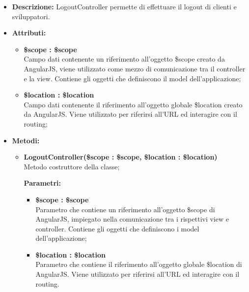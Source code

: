 \begin{itemize}
	\item \textbf{Descrizione:} LogoutController permette di effettuare il logout di clienti e sviluppatori.
	\item \textbf{Attributi:}
	\begin{itemize}
		
		\item \textbf{\$scope : \$scope}\\
		Campo dati contenente un riferimento all'oggetto \$scope creato da AngularJS, viene utilizzato come mezzo di comunicazione tra il controller e la view. Contiene gli oggetti che definiscono il model dell'applicazione;
		
		\item \textbf{\$location : \$location }\\
		Campo dati contenente il riferimento all'oggetto globale \$location creato da AngularJS. Viene utilizzato per riferirsi all'URL ed interagire con il routing;
		
	\end{itemize}
	\item \textbf{Metodi:}
	\begin{itemize}
		
		\item \textbf{LogoutController(\$scope : \$scope, \$location : \$location)}\\
		Metodo costruttore della classe;
		\begin{description}
			\item[\textbf{Parametri:}]
		\end{description}
		\begin{itemize}
			\item \textbf{\$scope : \$scope}\\
			Parametro che contiene un riferimento all'oggetto \$scope di AngularJS, impiegato nella comunicazione tra i rispettivi view e controller. Contiene gli oggetti che definiscono i model dell'applicazione;
			
			\item \textbf{\$location : \$location}\\
			Parametro che contiene il riferimento all'oggetto globale \$location di AngularJS. Viene utilizzato per riferirsi all'URL ed interagire con il routing.
			
		\end{itemize}	
		

\end{itemize}
\end{itemize}
